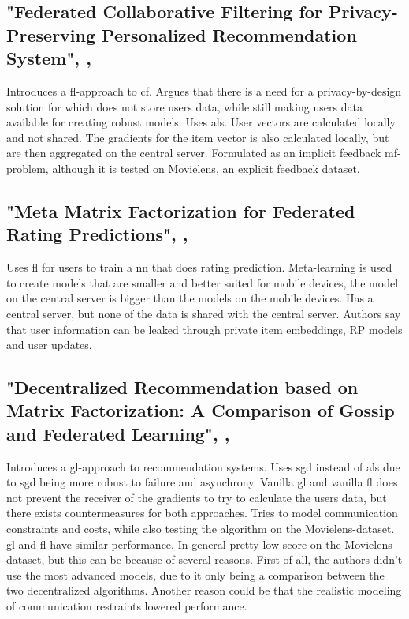 \subsection{"Federated Collaborative Filtering for Privacy-Preserving Personalized Recommendation System", \citeyear{ammaduddin2019federated}, \cite{ammaduddin2019federated}}

Introduces a \acrshort{fl}-approach to \acrshort{cf}. Argues that there is a need for a privacy-by-design solution for  which does not store users data, while still making users data available for creating robust models. Uses \acrfull{als}. User vectors are calculated locally and not shared. The gradients for the item vector is also calculated locally, but are then aggregated on the central server. Formulated as an implicit feedback \acrshort{mf}-problem, although it is tested on Movielens, an explicit feedback dataset.

\subsection{"Meta Matrix Factorization for Federated Rating Predictions", \citeyear{lin2020meta}, \cite{lin2020meta}}

Uses \acrshort{fl} for users to train a \acrlong{nn} that does rating prediction. Meta-learning is used to create models that are smaller and better suited for mobile devices, the model on the central server is bigger than the models on the mobile devices. Has a central server, but none of the data is shared with the central server. Authors say that user information can be leaked through private item embeddings, RP
models and user updates.

\subsection{"Decentralized Recommendation based on Matrix Factorization: A Comparison of Gossip and Federated Learning", \citeyear{glrecsys}, \cite{glrecsys}}

Introduces a \acrshort{gl}-approach to recommendation systems. Uses \acrshort{sgd} instead of \acrshort{als} due to \acrshort{sgd} being more robust to failure and asynchrony. Vanilla \acrshort{gl} and vanilla \acrshort{fl} does not prevent the receiver of the gradients to try to calculate the users data, but there exists countermeasures for both approaches. Tries to model communication constraints and costs, while also testing the algorithm on the Movielens-dataset. \acrshort{gl} and \acrshort{fl} have similar performance. In general pretty low score on the Movielens-dataset, but this can be because of several reasons. First of all, the authors didn't use the most advanced models, due to it only being a comparison between the two decentralized algorithms. Another reason could be that the realistic modeling of communication restraints lowered performance.

